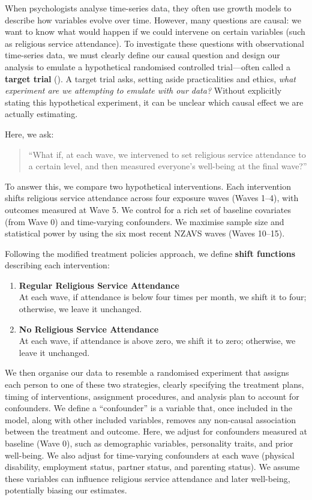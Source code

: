 \documentclass[
  single column]{article}
\begin{document}
When psychologists analyse time-series data, they often use growth
models to describe how variables evolve over time. However, many
questions are causal: we want to know what would happen if we could
intervene on certain variables (such as religious service attendance).
To investigate these questions with observational time-series data, we
must clearly define our causal question and design our analysis to
emulate a hypothetical randomised controlled trial---often called a
\textbf{target trial} (). A target trial asks, setting aside practicalities and ethics,
\emph{what experiment are we attempting to emulate with our data?}
Without explicitly stating this hypothetical experiment, it can be
unclear which causal effect we are actually estimating.

Here, we ask:

\begin{quote}
``What if, at each wave, we intervened to set religious service
attendance to a certain level, and then measured everyone's well-being
at the final wave?''
\end{quote}

To answer this, we compare two hypothetical interventions. Each
intervention shifts religious service attendance across four exposure
waves (Waves 1--4), with outcomes measured at Wave 5. We control for a
rich set of baseline covariates (from Wave 0) and time-varying
confounders. We maximise sample size and statistical power by using the
six most recent NZAVS waves (Waves 10--15).

Following the modified treatment policies approach, we define
\textbf{shift functions} describing each intervention:

\begin{enumerate}
\def\labelenumi{\arabic{enumi}.}
\item
  \textbf{Regular Religious Service Attendance}\\
  At each wave, if attendance is below four times per month, we shift it
  to four; otherwise, we leave it unchanged.
\item
  \textbf{No Religious Service Attendance}\\
  At each wave, if attendance is above zero, we shift it to zero;
  otherwise, we leave it unchanged.
\end{enumerate}

We then organise our data to resemble a randomised experiment that
assigns each person to one of these two strategies, clearly specifying
the treatment plans, timing of interventions, assignment procedures, and
analysis plan to account for confounders. We define a ``confounder'' is
a variable that, once included in the model, along with other included
variables, removes any non-causal association between the treatment and
outcome. Here, we adjust for confounders measured at baseline (Wave 0),
such as demographic variables, personality traits, and prior well-being.
We also adjust for time-varying confounders at each wave (physical
disability, employment status, partner status, and parenting status). We
assume these variables can influence religious service attendance and
later well-being, potentially biasing our estimates.
\end{document}
